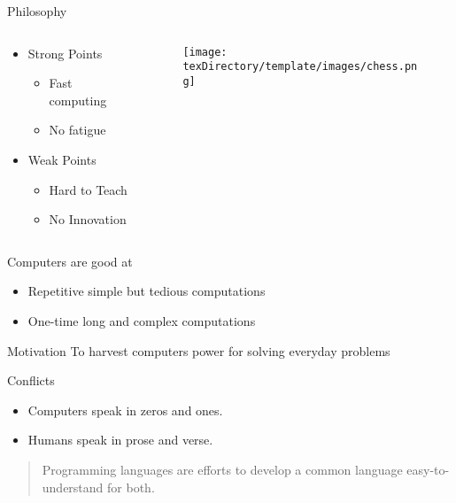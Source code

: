 \documentclass[10pt, compress]{beamer}
\begin{document}
\begin{slide}
	\begin{block}{Philosophy}
		\begin{columns}
			\begin{column}{0.4\textwidth}
			\begin{itemize}
				\item[] Strong Points
				\begin{itemize}
					\item[] Fast computing
					\item[] No fatigue
				\end{itemize}
				\item[] Weak Points
				\begin{itemize}
					\item[] Hard to Teach
					\item[] No Innovation
				\end{itemize}
			\end{itemize}
			\end{column}
			\begin{column}{0.6\textwidth}
			\begin{figure}[H]\centering
				\texttt{[image: \\texDirectory/template/images/chess.png]}
			\end{figure}
			\end{column}
		\end{columns}
	\end{block}
\end{slide}

\begin{slide}
	\begin{block}{Computers are good at}
		\begin{itemize}
			\item[] Repetitive simple but tedious computations
			\item[] One-time long and complex computations
		\end{itemize}
	\end{block}
	\begin{block}{Motivation}
		To harvest computers power for solving everyday problems
	\end{block}
\end{slide}

\begin{slide}
	\begin{block}{Conflicts}
		\begin{itemize}
			\item[] Computers speak in zeros and ones.
			\item[] Humans speak in prose and verse.
		\end{itemize}
	\end{block}
	\begin{quote}
		Programming languages are efforts to develop a common language easy-to-understand for both.
	\end{quote}
\end{slide}
\end{document}
